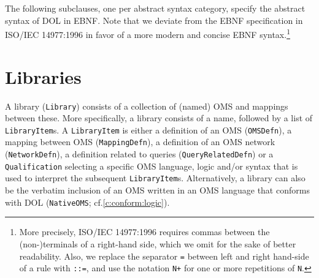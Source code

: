 \documentclass[10pt,fleqn,%
\ifpretendfinal
final%
\else
draft%
\fi,
]{scrreprt}
\makeatletter
\newcommand{\red}[1]{#1} %
\newcommand*{\cf}{cf.\@\xspace}
\newcommand*{\termref}[1]{\index{#1}#1\xspace}
\newcommand*{\syntax}[1]{\texttt{#1}}
\newcommand*{\IS}{OMG Specification\xspace}
\newcommand{\sclause}[1]{\section{#1}}
\newcommand{\nisref}[1]{#1}
\makeatother
\begin{document}
The following subclauses, one per abstract syntax category, specify the abstract syntax of DOL in EBNF. Note that we deviate from the EBNF specification in
 \nisref{ISO/IEC 14977:1996} in favor of a more modern and concise
EBNF syntax.\footnote{\red{More precisely, \nisref{ISO/IEC 14977:1996} requires commas between the (non-)terminals of a right-hand side, which we omit 
for the sake of better readability. Also, we replace the separator \syntax{=}
between left and right hand-side of a rule with \syntax{::=}, and 
use the notation \syntax{N+}
for one or more repetitions of \syntax{N}.}}  

\sclause{Libraries}\label{c:libraries}

A \termref{library} (\syntax{Library}) consists of a collection of (named)  OMS and mappings between these.  More specifically, a
library consists of a name, followed by a list of
\syntax{LibraryItem}s.  A \syntax{LibraryItem} is either a
definition of an OMS  (\syntax{OMSDefn}), 
a mapping between OMS
(\syntax{MappingDefn}), 
\red{a definition of an OMS network  (\syntax{NetworkDefn}),}
a definition related to queries 
(\syntax{QueryRelatedDefn})
or a \syntax{Qualification} selecting a specific
OMS language, logic and/or syntax that is used to interpret the
subsequent \syntax{LibraryItem}s.  Alternatively, a library can also be the verbatim inclusion of an OMS written in
an OMS language that conforms with DOL (\syntax{NativeOMS}; \cf \ref{c:conform:logic}).
\end{document}
